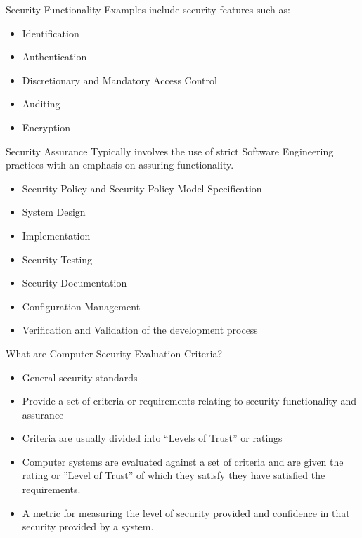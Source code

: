 \documentclass[xcolor=dvipsname,t]{beamer}
\begin{document}
\begin{frame} {Security Functionality}
    Examples include security features such as:
    \begin{itemize}
        \item Identification
        \item Authentication
        \item Discretionary and Mandatory Access Control
        \item Auditing
        \item Encryption
    \end{itemize}
\end{frame}

\begin{frame} {Security Assurance}
    Typically involves the use of strict Software Engineering practices
    with an emphasis on assuring functionality.
    \begin{itemize}
        \item Security Policy and Security Policy Model Specification
        \item System Design
        \item Implementation
        \item Security Testing
        \item Security Documentation
        \item Configuration Management
        \item Verification and Validation of the development process
    \end{itemize}
\end{frame}

\begin{frame} {What are Computer Security Evaluation Criteria?}
    \begin{itemize}
        \item General security standards
        \item Provide a set of criteria or requirements relating
              to security functionality and assurance
        \item Criteria are usually divided into ``Levels of Trust''
              or ratings
        \item Computer systems are evaluated against a set of
              criteria and are given the rating or ''Level of Trust''
              of which they satisfy they have satisfied the requirements.
        \item A metric for measuring the level of security provided
              and confidence in that security provided by a system.
    \end{itemize}
\end{frame}
\end{document}
